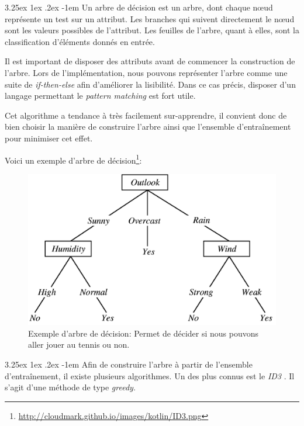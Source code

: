 \documentclass[a4paper, 11pt]{article}
\makeatletter
\renewcommand\paragraph{\@startsection{paragraph}{5}{\z@}%
  {3.25ex \@plus1ex \@minus.2ex}%
  {-1em}%
  {\normalfont\normalsize\bfseries}}
\makeatother
\begin{document}
\paragraph{}
Un arbre de décision est un arbre, dont chaque nœud représente un test sur un attribut. 
Les branches qui suivent directement le nœud sont les valeurs possibles de l'attribut. 
Les feuilles de l'arbre, quant à elles, sont la classification d'éléments donnés en entrée.

Il est important de disposer des attributs avant de commencer la construction de l'arbre. 
Lors de l'implémentation, nous pouvons représenter l'arbre comme une suite de \textit{if-then-else} afin 
d'améliorer la lisibilité. Dans ce cas précis, disposer d'un langage permettant le \textit{pattern matching} est fort utile.

Cet algorithme a tendance à très facilement sur-apprendre, il convient donc de bien choisir la manière de construire 
l'arbre ainsi que l'ensemble d'entraînement pour minimiser cet effet. 

Voici un exemple d'arbre de décision\footnote{\url{http://cloudmark.github.io/images/kotlin/ID3.png}}:
\begin{figure}[h!]
\centering
\includegraphics{images/exemple_tree}
\caption{Exemple d'arbre de décision: Permet de décider si nous pouvons aller jouer au tennis ou non.}
\end{figure}

\paragraph{}
Afin de construire l'arbre à partir de l'ensemble d'entraînement, il existe plusieurs algorithmes. 
Un des plus connus est le \textit{ID3} \cite{id3}. Il s'agit d'une méthode de type \textit{greedy}.
\end{document}
